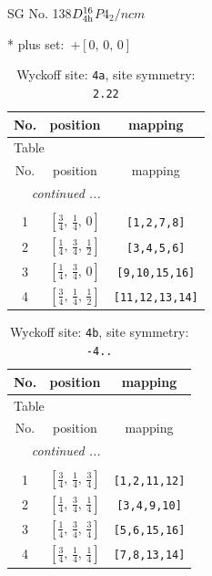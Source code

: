 \documentclass[fleqn,8pt]{jsarticle}
\begin{document}
\setcounter{MaxMatrixCols}{32}

\renewcommand{\tablename}{Table~}
\renewcommand{\figurename}{Figure~}
\begin{center}
\LARGE
SG No. 138\quad$D_{\rm 4h}^{16}$\quad$P4_2/ncm$\quad[ tetragonal ]
\end{center}
* plus set:\,\,\,$+\left[ 0,\, 0,\, 0 \right]$
\renewcommand{\arraystretch}{1.2}
\begin{longtable}{ccc}
\caption{Wyckoff site: {\tt 4a}, site symmetry: {\tt 2.22}}
 \\
 \hline \hline
No. & position & mapping \\ \hline \endfirsthead

\multicolumn{2}{l}{\tablename\ \thetable{}} \\
 \hline \hline
No. & position & mapping \\ \hline \endhead

 \hline \hline
\multicolumn{2}{r}{\footnotesize\it continued ...} \\ \endfoot

 \hline \hline
\multicolumn{2}{r}{} \\ \endlastfoot

1 & $\left[ \frac{3}{4},\, \frac{1}{4},\, 0 \right]$ & {\tt [1,2,7,8]} \\ \hline
2 & $\left[ \frac{1}{4},\, \frac{3}{4},\, \frac{1}{2} \right]$ & {\tt [3,4,5,6]} \\ \hline
3 & $\left[ \frac{1}{4},\, \frac{3}{4},\, 0 \right]$ & {\tt [9,10,15,16]} \\ \hline
4 & $\left[ \frac{3}{4},\, \frac{1}{4},\, \frac{1}{2} \right]$ & {\tt [11,12,13,14]} \\
\end{longtable}
\renewcommand{\arraystretch}{1.2}
\begin{longtable}{ccc}
\caption{Wyckoff site: {\tt 4b}, site symmetry: {\tt -4..}}
 \\
 \hline \hline
No. & position & mapping \\ \hline \endfirsthead

\multicolumn{2}{l}{\tablename\ \thetable{}} \\
 \hline \hline
No. & position & mapping \\ \hline \endhead

 \hline \hline
\multicolumn{2}{r}{\footnotesize\it continued ...} \\ \endfoot

 \hline \hline
\multicolumn{2}{r}{} \\ \endlastfoot

1 & $\left[ \frac{3}{4},\, \frac{1}{4},\, \frac{3}{4} \right]$ & {\tt [1,2,11,12]} \\ \hline
2 & $\left[ \frac{1}{4},\, \frac{3}{4},\, \frac{1}{4} \right]$ & {\tt [3,4,9,10]} \\ \hline
3 & $\left[ \frac{1}{4},\, \frac{3}{4},\, \frac{3}{4} \right]$ & {\tt [5,6,15,16]} \\ \hline
4 & $\left[ \frac{3}{4},\, \frac{1}{4},\, \frac{1}{4} \right]$ & {\tt [7,8,13,14]} \\
\end{longtable}
\end{document}
